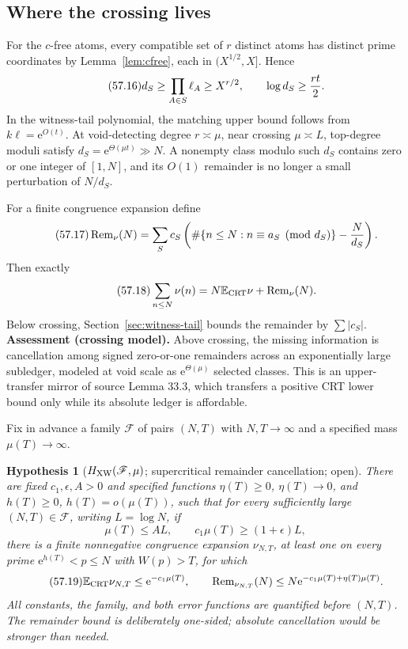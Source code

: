 \documentclass[10pt,reqno]{amsart}
\newtheorem{hypothesis}[theorem]{Hypothesis}
\theoremstyle{definition}
\newcommand{\e}{\mathrm e}
\newcommand{\1}{\mathbf 1}
\begin{document}
\subsection{Where the crossing lives}
For the $c$-free atoms, every compatible set of $r$ distinct atoms has
distinct prime coordinates by Lemma~\ref{lem:cfree}, each in
$(X^{1/2},X]$.  Hence
\begin{equation}\tag{57.16}
 d_S\geq\prod_{A\in S}\ell_A\geq X^{r/2},
       \qquad \log d_S\geq {rt\over2}.
\end{equation}
In the witness-tail polynomial, the matching upper bound follows from
$k\ell=\e^{O(t)}$.  At void-detecting degree $r\asymp\mu$, near crossing
$\mu\asymp L$, top-degree moduli satisfy
$d_S=\e^{\Theta(\mu t)}\gg N$.  A nonempty class modulo such $d_S$ contains
zero or one integer of $[1,N]$, and its $O(1)$ remainder is no longer a
small perturbation of $N/d_S$.

For a finite congruence expansion define
\begin{equation}\tag{57.17}
 \operatorname {Rem}_\nu(N)=\sum_Sc_S\left(
 \#\{n\leq N:n\equiv a_S\pmod {d_S}\}-{N\over d_S}\right).
\end{equation}
Then exactly
\begin{equation}\tag{57.18}
 \sum_{n\leq N}\nu(n)=N\mathbb E_{\rm CRT}\nu+
                         \operatorname {Rem}_\nu(N).
\end{equation}
Below crossing, Section~\ref{sec:witness-tail} bounds the remainder by
$\sum|c_S|$.  \textbf{Assessment (crossing model).}  Above crossing, the
missing information is cancellation among signed zero-or-one remainders
across an exponentially large subledger, modeled at void scale as
$\e^{\Theta(\mu)}$ selected classes.  This is an upper-transfer mirror of
source Lemma 33.3, which transfers a positive CRT lower bound only while its
absolute ledger is affordable.

Fix in advance a family $\mathscr F$ of pairs $(N,T)$ with $N,T\to\infty$
and a specified mass $\mu(T)\to\infty$.

\begin{hypothesis}[$H_{\rm XW}(\mathscr F,\mu)$; supercritical remainder
cancellation; open]\label{hyp:XW}
There are fixed $c_1,\epsilon,A>0$ and specified functions
$\eta(T)\geq0$, $\eta(T)\to0$, and $h(T)\geq0$, $h(T)=o(\mu(T))$, such that
for every sufficiently large $(N,T)\in\mathscr F$, writing $L=\log N$, if
\[
 \mu(T)\leq AL,\qquad c_1\mu(T)\geq(1+\epsilon)L,
\]
there is a finite nonnegative congruence expansion $\nu_{N,T}$, at least one
on every prime $\e^{h(T)}<p\leq N$ with $W(p)>T$, for which
\begin{equation}\tag{57.19}
 \mathbb E_{\rm CRT}\nu_{N,T}\leq\e^{-c_1\mu(T)},\qquad
 \operatorname {Rem}_{\nu_{N,T}}(N)
 \leq N\e^{-c_1\mu(T)+\eta(T)\mu(T)}.
\end{equation}
All constants, the family, and both error functions are quantified before
$(N,T)$.  The remainder bound is deliberately one-sided; absolute
cancellation would be stronger than needed.
\end{hypothesis}
\end{document}
